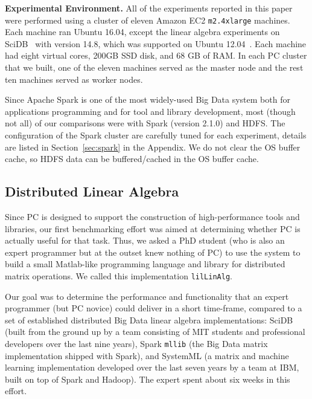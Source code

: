 \vspace{5pt}
\noindent
\textbf {Experimental Environment.} All of the experiments reported in this paper were performed using a
cluster of eleven Amazon EC2 \texttt{m2.4xlarge} machines. Each machine
ran Ubuntu 16.04, except the linear algebra experiments on
SciDB~\cite{brown2010overview, stonebraker2011architecture}
with version 14.8, which
was supported on Ubuntu 12.04~\cite{SciDBOS}. Each machine had eight
virtual cores, 200GB SSD
disk, and 68 GB of RAM. In each PC cluster that we built, one of the eleven machines served as the master
node and the rest ten machines served as worker nodes.

Since Apache Spark is one of the most widely-used Big Data system both for applications programming and for tool and library
development, most
(though not all) of our comparisons were with Spark  (version
2.1.0) and HDFS. The configuration of the Spark cluster are carefully tuned for each
experiment, details are listed in Section~\ref{sec:spark} in the Appendix. We do not clear the OS buffer cache, so HDFS data can be
buffered/cached in the OS buffer cache. 

\subsection {Distributed Linear Algebra}
Since PC is designed to support the construction
of high-performance tools and libraries, our first benchmarking effort was aimed at determining 
whether PC is actually useful for that task.  Thus, we asked
a PhD student (who is also an expert programmer but at the outset knew nothing of PC) 
to use the system to build a small Matlab-like 
programming language and library for distributed matrix operations.
We called this implementation \texttt{lilLinAlg}.

Our goal was to determine the 
performance and functionality that an expert programmer (but PC novice) could deliver in a short
time-frame, compared to a set of established distributed Big Data linear algebra implementations:
SciDB \cite{brown2010overview, stonebraker2011architecture} (built from the ground up by a team
consisting of MIT students and professional developers over the last
nine years), Spark \texttt{mllib} \cite{meng2016mllib} 
(the Big Data matrix
implementation shipped with Spark), and SystemML \cite{boehm2014hybrid, ghoting2011systemml, boehm2016systemml}
(a matrix and machine learning implementation developed
over the last seven years by a team at IBM, built on top of Spark and Hadoop).
The expert spent about six weeks in this effort.

